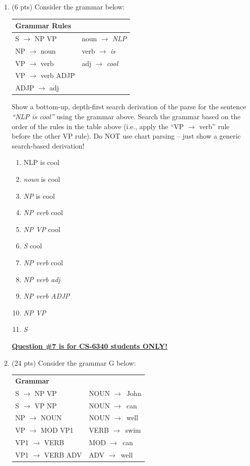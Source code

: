 \documentclass[11pt]{article}
\newcommand{\ra}{$\rightarrow$~}
\begin{document}
\begin{enumerate}
\newpage
\item (6 pts) Consider the grammar below:

\begin{center}
\begin{tabular}{|ll|} \hline
\textbf{Grammar Rules} & \\  \hline
S $\rightarrow$ NP VP & noun $\rightarrow$ {\it NLP} \\
NP $\rightarrow$ noun & verb $\rightarrow$ {\it is} \\
VP $\rightarrow$ verb & adj $\rightarrow$  {\it cool} \\
VP $\rightarrow$ verb ADJP & ~ \\
ADJP $\rightarrow$ adj & ~ \\ \hline
\end{tabular}
\end{center}

Show a bottom-up, depth-first search derivation of the parse for the
  sentence {\it ``NLP is cool''} using the grammar above. Search the grammar based on
  the order of the rules in the table above (i.e., apply the ``VP $\rightarrow$
   verb'' rule before the other VP rule). 
Do NOT use chart parsing -- just show a generic search-based derivation!
\\
\begin{enumerate}
  \color{red}
  \item[]  NLP is cool
  \item[]  {\it noun} is cool
  \item[]  {\it NP} is cool
  \item[]  {\it NP verb} cool
  \item[]  {\it NP VP} cool
  \item[]  {\it S} cool
  \item[]  {\it NP verb} cool
  \item[]  {\it NP verb adj} 
  \item[]  {\it NP verb ADJP} 
  \item[]  {\it NP VP} 
  \item[]  {\it S} 
\end{enumerate}

\newpage
\underline{\textbf{Question \#7 is for CS-6340 students ONLY!}}  \\

\item (24 pts) Consider the grammar G below:

\begin{center}
\begin{tabular}{|ll|} \hline
\textbf{Grammar} & ~ \\  
S $\rightarrow$ NP VP    & NOUN \ra John \\
S $\rightarrow$ VP NP    & NOUN \ra can \\
NP $\rightarrow$ NOUN    & NOUN \ra well \\
VP $\rightarrow$ MOD VP1 & VERB \ra swim \\
VP1 $\rightarrow$ VERB   & MOD \ra can \\
VP1 $\rightarrow$ VERB ADV & ADV \ra well \\  \hline
\end{tabular}
\end{center}


\end{enumerate}
\end{document}
